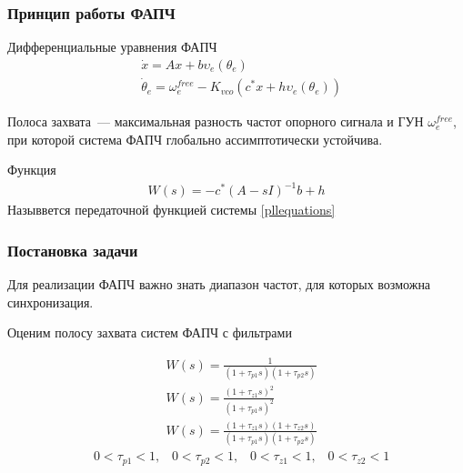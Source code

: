\documentclass{beamer}
\begin{document}
\begin{frame}
\frametitle{Принцип работы ФАПЧ}
Дифференциальные уравнения ФАПЧ
 \begin{equation}\label{pllequations}
 \begin{aligned}
 &\dot{x} = Ax + b\upsilon_e(\theta_e) \\
 &\dot{\theta}_e = \omega_e^{free} - K_{vco}(c^*x + h\upsilon_e(\theta_e))
 \end{aligned}
\end{equation}

\begin{definition}
Полоса захвата~--- максимальная разность частот опорного сигнала и ГУН $\omega_e^{free}$, при которой система ФАПЧ глобально ассимптотически устойчива. 
\end{definition}
\begin{definition}
Функция  
\begin{equation}\label{system}
 \begin{aligned}
 W(s) = -c^*\left(A-sI\right)^{-1}b + h
 \end{aligned}
\end{equation}
Назыввется передаточной функцией системы \eqref{pllequations}
\end{definition}
\end{frame}

\begin{frame}
\frametitle{Постановка задачи}
Для реализации ФАПЧ важно знать диапазон частот, для которых возможна синхронизация.
\begin{center}
\Large
Оценим полосу захвата систем ФАПЧ с фильтрами
\end{center}
\begin{equation*}
 \begin{aligned}
&W(s) = \frac{1}{(1+\tau_{p1}s)(1+\tau_{p2}s)}\\[5pt]
&W(s) = \frac{(1+\tau_{z1}s)^2}{(1+\tau_{p1}s)^2}\\[5pt]
&W(s) = \frac{(1+\tau_{z1}s)(1+\tau_{z2}s)}{(1+\tau_{p1}s)(1+\tau_{p2}s)}
 \end{aligned}
\end{equation*}
\begin{equation*}
 \begin{aligned}
&0 < \tau_{p1} < 1 \text{,} \quad 0 < \tau_{p2} <1 \text{,} \quad 0 < \tau_{z1} < 1 \text{,} \quad 0 < \tau_{z2} <1
 \end{aligned}
\end{equation*}
\end{frame}
\end{document}
